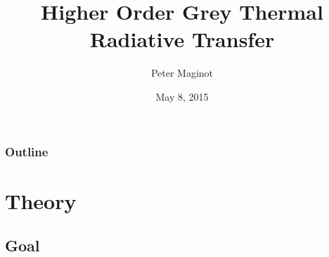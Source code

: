 \documentclass{beamer}
\title{Higher Order Grey Thermal Radiative Transfer}
\author{Peter Maginot}\institute{Texas A\&M University- Department of Nuclear Engineering}
\date{May 8, 2015}
\newif\ifplacelogo %
\begin{document}
\placelogotrue
\begin{frame}
\titlepage


\end{frame}


\placelogofalse
\begin{frame}
\frametitle{Outline}
\tableofcontents[hideallsubsections]
\end{frame}

\section{Theory}

\subsection{Goal}
\end{document}
